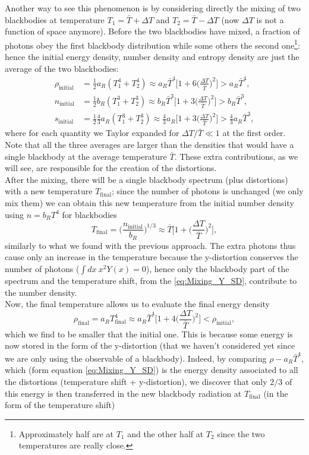 Another way to see this phenomenon is by considering directly the mixing of two blackbodies at temperature $T_1=\bar T+\Delta T$ and $T_2=\bar T-\Delta T$ (now $\Delta T$ is not a function of space anymore). Before the two blackbodies have mixed, a fraction of photons  obey the first blackbody distribution while some others the second one\footnote{Approximately half are at $T_1$ and the other half at $T_2$ since the two temperatures are really close.}: hence the initial energy density, number density and entropy density are just the average of the two blackbodies:
\begin{align}\label{eq:Mix_rho_initial}
    \rho_\text{initial}&= \frac{1}{2}a_R(T_1^4+T_2^4)\approx a_R\bar T^4\bigg[1+6\bigg(\frac{\Delta T}{\bar T}\bigg)^2\bigg]>a_R\bar T^4,\\\label{eq:Mix_n_initial}
    n_\text{initial}&= \frac{1}{2}b_R(T_1^3+T_2^3)\approx b_R\bar T^3\bigg[1+3\bigg(\frac{\Delta T}{\bar T}\bigg)^2\bigg]>b_R\bar T^3,\\\label{eq:Mix_s_initial}
    s_\text{initial}&= \frac{1}{2}\frac{4}{3}a_R( T_1^3+T_2^3)\approx\frac{4}{3}a_R\bigg[1+3\bigg(\frac{\Delta T}{\bar T}\bigg)^2\bigg]>\frac{4}{3}a_R\bar T^3,
\end{align}
where for each quantity we Taylor expanded for $\Delta T/\bar T\ll 1$ at the first order.\\
Note that all the three averages are larger than the densities that would have a single blackbody at the average temperature $\bar T$. These extra contributions, as we will see, are responsible for the creation of the distortions.\\After the mixing, there will be a single blackbody spectrum (plus distortions) with a new temperature $T_\text{final}$; since the number of photons is unchanged (we only mix them) we can obtain this new temperature from the initial number density using $n=b_RT^4$ for blackbodies
$$T_\text{final}=\bigg(\frac{n_\text{initial}}{b_R}\bigg)^{1/3}\approx\bar T\bigg[1+\bigg(\frac{\Delta T}{\bar T}\bigg)^2\bigg],$$ similarly to what we found with the previous approach. The extra photons thus cause only an increase in the temperature because the y-distortion conserves the number of photons ($\int dx\ x^2Y(x)=0$), hence only the blackbody part of the spectrum and the temperature shift, from the \eqref{eq:Mixing_Y_SD}, contribute to the number density.\\
Now, the final temperature allows us to evaluate the final energy density
$$\rho_\text{final}=a_RT_\text{final}^4\approx a_R\bar T^4\bigg[1+4\bigg(\frac{\Delta T}{\bar T}\bigg)^2\bigg]<\rho_\text{initial},$$ which we find to be smaller that the initial one. This is because some energy is now stored in the form of the y-distortion (that we haven't considered yet since we are only using the observable of a blackbody). Indeed, by comparing $\rho-a_R\bar T^4$, which (form equation \ref{eq:Mixing_Y_SD}) is the energy density associated to all the distortions (temperature shift + y-distortion), we discover that only $2/3$ of this energy is then transferred in the new blackbody radiation at $T_\text{final}$ (in the form of the temperature shift)
